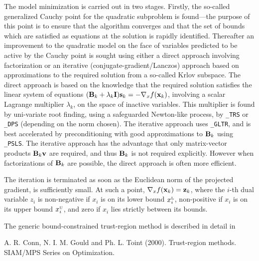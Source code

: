 \documentclass{galahad}
\newcommand{\sL}{\s{L}}
\newcommand{\sU}{\s{U}}
\begin{document}
The model minimization is carried out in two stages.
Firstly, the so-called generalized Cauchy point for the quadratic
subproblem is found---the purpose of this point is to ensure that the
algorithm converges and that the set of bounds which are satisfied as
equations at the solution is rapidly identified.  Thereafter an
improvement to the quadratic model on the face of variables predicted
to be active by the Cauchy point is sought using either a
direct approach involving factorization or an
iterative (conjugate-gradient/Lanczos) approach based on approximations
to the required solution from a so-called Krlov subspace. The direct
approach is based on the knowledge that the required solution
satisfies the linear system of equations $({\mathbf{B}}_k + \lambda_k {\mathbf{I}}) {\mathbf{s}}_k
= - \nabla_x f({\mathbf{x}}_k)$, involving a scalar Lagrange multiplier $\lambda_k$,
on the space of inactive variables.
This multiplier is found by uni-variate root finding, using a safeguarded
Newton-like process, by {\tt \libraryname\_TRS} or {\tt \libraryname\_DPS}
(depending on the norm chosen). The iterative approach
uses {\tt \libraryname\_GLTR}, and is best accelerated by preconditioning
with good approximations to ${\mathbf{B}}_k$ using {\tt \libraryname\_PSLS}. The
iterative approach has the advantage that only matrix-vector products
${\mathbf{B}}_k {\mathbf{v}}$ are required, and thus ${\mathbf{B}}_k$ is not required explicitly.
However when factorizations of ${\mathbf{B}}_k$ are possible, the direct approach
is often more efficient.
\vspace*{1mm}

The iteration is terminated as soon as the Euclidean norm of the 
projected gradient,
\disp{\|\min(\max( \bmx_k - \nabla_x f(\bmx_k), \bmx\sL), \bmx\sU) -\bmx_k\|_2,}
is sufficiently small. At such a point, $\nabla_x f({\mathbf{x}}_k) = {\mathbf{z}}_k$, 
where the $i$-th dual variable $z_i$ is non-negative if $x_i$ is on its
lower bound $x\sL_i$, non-positive if $x_i$ is on its upper bound $x\sU_i$,
and zero if $x_i$ lies strictly between its bounds.

\galreferences
\vspace*{1mm}

\noindent
The generic bound-constrained trust-region method is described in detail in
\vspace*{1mm}

\noindent
A. R. Conn, N. I. M. Gould and Ph. L. Toint (2000).
Trust-region methods.
SIAM/MPS Series on Optimization.

\end{document}
